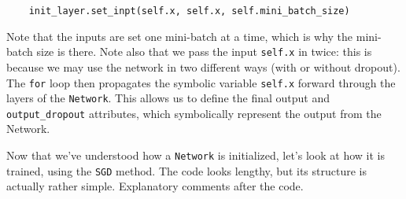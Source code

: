 \begin{lstlisting}
    init_layer.set_inpt(self.x, self.x, self.mini_batch_size)
\end{lstlisting}

Note that the inputs are set one mini-batch at a time, which is why the mini-batch size is there. Note also that we pass the input \lstinline{self.x} in twice: this is because we may use the network in two different ways (with or without dropout). The \lstinline{for} loop then propagates the symbolic variable \lstinline{self.x} forward through the layers of the \lstinline{Network}. This allows us to define the final output and \lstinline{output_dropout} attributes, which symbolically represent the output from the Network.

Now that we've understood how a \lstinline{Network} is initialized, let's look at how it is trained, using the \lstinline{SGD} method. The code looks lengthy, but its structure is actually rather simple. Explanatory comments after the code.

